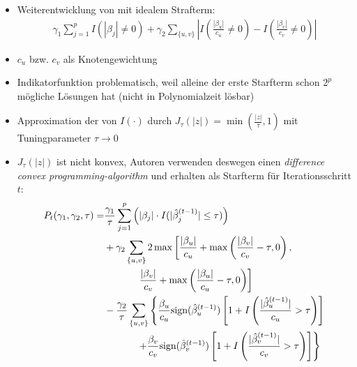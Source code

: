 \documentclass{beamer}
\begin{document}
\begin{frame}
	\begin{itemize}
	\item Weiterentwicklung von \cite{kim_network-based_2013} mit {\glqq}idealem{\grqq} Strafterm:
	\begin{align*}
	\gamma_1 \sum_{j=1}^{p}I(|\beta_j|\neq 0) + \gamma_2 \sum_{\{u,v\}}\left| I\left( \frac{|\beta_u|}{c_u} \neq 0 \right) - I\left( \frac{|\beta_v|}{c_v} \neq 0 \right) \right|
	\end{align*}
	\item $c_u$ bzw. $c_v$ als Knotengewichtung
	\item Indikatorfunktion problematisch, weil
	alleine der erste Starfterm schon $2^p$ mögliche Lösungen hat (nicht in Polynomialzeit lösbar)
	\item Approximation der von $I(\cdot)$ durch  $J_\tau(|z|)=\min (\frac{|z|}{\tau}, 1)$ mit Tuningparameter $\tau \rightarrow 0$
	\end{itemize}
\end{frame}


\begin{frame}
	\begin{itemize}
	\item $J_\tau(|z|)$ ist nicht konvex, Autoren verwenden deswegen einen \textit{difference convex programming-algorithm} und erhalten als Starfterm für Iterationsschritt $t$:
	\begin{align*}
	P_t(\gamma_1, \gamma_2, \tau) =& \frac{\gamma_1}{\tau} \sum_{j=1}^{p}\left(|\beta_j|\cdot I(|\hat{\beta}_j^{(t-1)}| \leq \tau)\right) \notag \\
	&+ \gamma_2 \sum_{\{u,v\}} 2\max \left[\frac{|\beta_u|}{c_u}+\max\left(\frac{|\beta_v|}{c_v}-\tau, 0\right), \right. \\
	&\phantom{{}=1111} \left.\frac{|\beta_v|}{c_v}+\max\left(\frac{|\beta_u|}{c_u}-\tau, 0\right)\right] \notag \\
	&- \frac{\gamma_2}{\tau} \sum_{\{u,v\}} \left\lbrace
	\frac{\beta_u}{c_u}\text{sign}(\hat{\beta}_u^{(t-1)}) \left[1+I\left(\frac{|\hat{\beta}_u^{(t-1)}|}{c_u}>\tau \right) \right] \right. \notag \\
	&\phantom{{}=1111} \left. + 
	\frac{\beta_v}{c_v}\text{sign}(\hat{\beta}_v^{(t-1)})\left[1+I\left(\frac{|\hat{\beta}_v^{(t-1)}|}{c_v}>\tau \right) \right]
	\right\rbrace
	\end{align*}
	\end{itemize}
\end{frame}
\end{document}
